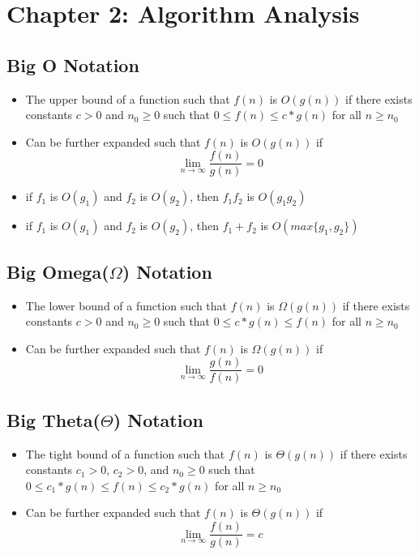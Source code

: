 \documentclass[notitlepage]{article}
\begin{document}
 \section{Chapter 2: Algorithm Analysis}
    \subsection{Big O Notation}
        \begin{itemize}
            \item  The upper bound of a function such that $f(n)$ is $O(g(n))$ if 
            there exists constants $c > 0$ and $n_0 \geq 0$ such that $ 0 \leq f(n) \leq c * g(n)$ for
            all $n \geq n_0$ \\
            \item Can be further expanded such that $f(n)$ is $O(g(n))$ if 
            $$\lim\limits_{n \to \infty} \frac{f(n)}{g(n)} = 0$$
            \item if $f_1$ is $O(g_1)$ and $f_2$ is $O(g_2)$, then $f_1f_2$ is $O(g_1g_2)$
            \item if $f_1$ is $O(g_1)$ and $f_2$ is $O(g_2)$, then $f_1+f_2$ is $O(max\{ g_1, g_2\})$
        \end{itemize}
    \subsection{Big Omega($\Omega$) Notation}
        \begin{itemize}
            \item The lower bound of a function such that $f(n)$ is $\Omega(g(n))$ if 
                there exists constants $c > 0$ and $n_0 \geq 0$ such that $ 0 \leq c * g(n) \leq f(n)$
                for all $n \geq n_0$ \\
            \item Can be further expanded such that $f(n)$ is $\Omega(g(n))$ if 
                $$\lim\limits_{n \to \infty} \frac{g(n)}{f(n)} = 0$$
        \end{itemize}
    \subsection{Big Theta($\Theta$) Notation}
        \begin{itemize}
            \item The tight bound of a function such that $f(n)$ is $\Theta(g(n))$ if 
                there exists constants $c_1 > 0$, $c_2 > 0$, and $n_0 \geq 0$ such 
                that $ 0 \leq c_1*g(n) \leq f(n) \leq c_2*g(n)$  for all $n \geq n_0$ \\
            \item Can be further expanded such that $f(n)$ is $\Theta(g(n))$ if 
                $$\lim\limits_{n \to \infty} \frac{f(n)}{g(n)} = c$$
        \end{itemize}
\end{document}
